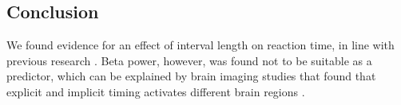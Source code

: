 \documentclass[man,floatsintext]{apa6} %
\begin{document}
\subsection{Conclusion}
We found evidence for an effect of interval length on reaction time,
in line with previous research \cite{naatanen_diminishing_1970,
  karlin_reaction_1959, drazin_effects_1961,
  grosjean_timing_2001}. Beta power, however, was found not to be
suitable as a predictor, which can be explained by brain imaging
studies that found that explicit and implicit timing activates
different brain regions \cite{coull_dissociating_2008}.



\end{document}
